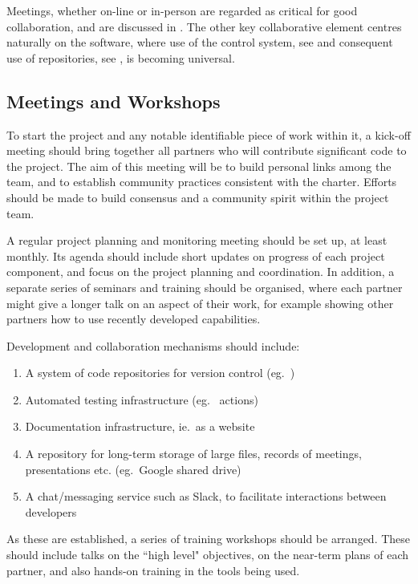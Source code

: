 
Meetings, whether on-line or in-person are regarded as critical for good collaboration,
and are discussed in . The other key collaborative element centres
naturally on the software, where use of the  control system, see 
and consequent use of repositories, see , is becoming universal.

\subsection{Meetings and Workshops} \label{sec:meet}

To start the project and any notable identifiable piece of work
within it, a kick-off meeting should bring
together all partners who will contribute significant code to the
project.  The aim of this meeting will be to build personal links
among the team, and to establish community practices consistent with the charter.
Efforts should be made to build consensus and
a community spirit within the project team.

A regular project planning and monitoring meeting should be set up,
at least monthly. Its agenda should include short updates on progress of
each project component, and focus on the project planning and
coordination. In addition, a separate series of seminars and training
should be organised, where each partner might give a longer talk on an
aspect of their work, for example showing other partners how to use
recently developed capabilities.


Development and collaboration mechanisms should include:
\begin{enumerate}
\item A system of code repositories for version control (eg.\ )
\item Automated testing infrastructure (eg.\  actions)
\item Documentation infrastructure, ie.\ as a website
\item A repository for long-term storage of large files, records of
meetings, presentations etc. (eg.\ Google shared drive)
\item A chat/messaging service such as Slack, to facilitate interactions
between developers
\end{enumerate}
As these are established, a series of training workshops should be
arranged. These should include talks on the ``high level" objectives, 
on the near-term plans of each partner, and also hands-on training in
the tools being used. 


